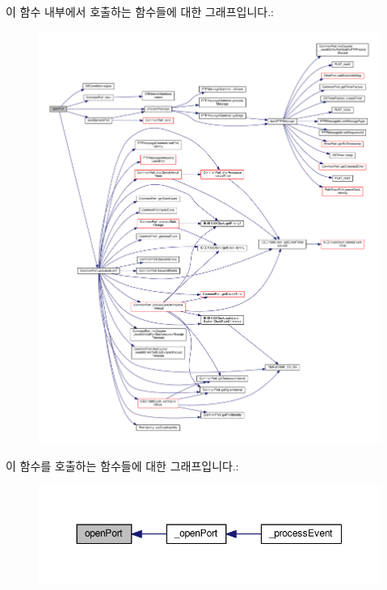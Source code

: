 이 함수 내부에서 호출하는 함수들에 대한 그래프입니다.\+:
\nopagebreak
\begin{figure}[H]
\begin{center}
\leavevmode
\includegraphics[width=350pt]{class_wireless_port_ac5c36d6d3f4bfbb168f215ace60b4f74_cgraph}
\end{center}
\end{figure}




이 함수를 호출하는 함수들에 대한 그래프입니다.\+:
\nopagebreak
\begin{figure}[H]
\begin{center}
\leavevmode
\includegraphics[width=350pt]{class_wireless_port_ac5c36d6d3f4bfbb168f215ace60b4f74_icgraph}
\end{center}
\end{figure}


